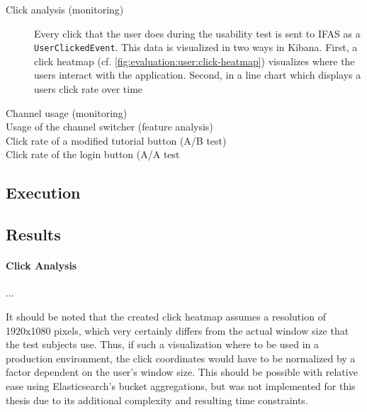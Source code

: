 \begin{description}
\item[Click analysis (monitoring)] Every click that the user does during the usability test is sent to \ac{IFAS} as a \texttt{UserClickedEvent}.
This data is visualized in two ways in Kibana.
First, a click heatmap (cf. \cref{fig:evaluation:user:click-heatmap}) visualizes where the users interact with the application.
Second, in a line chart which displays a users click rate over time
\item[Channel usage (monitoring)]
\item[Usage of the channel switcher (feature analysis)]
\item[Click rate of a modified tutorial button (A/B test)]
\item[Click rate of the login button (A/A test]
\end{description}



\subsection{Execution}

\subsection{Results}

\paragraph{Click Analysis}

...

It should be noted that the created click heatmap assumes a resolution of 1920x1080 pixels, which very certainly differs from the actual window size that the test subjects use.
Thus, if such a visualization where to be used in a production environment, the click coordinates would have to be normalized by a factor dependent on the user's window size.
This should be possible with relative ease using Elasticsearch's bucket aggregations, but was not implemented for this thesis due to its additional complexity and resulting time constraints.



